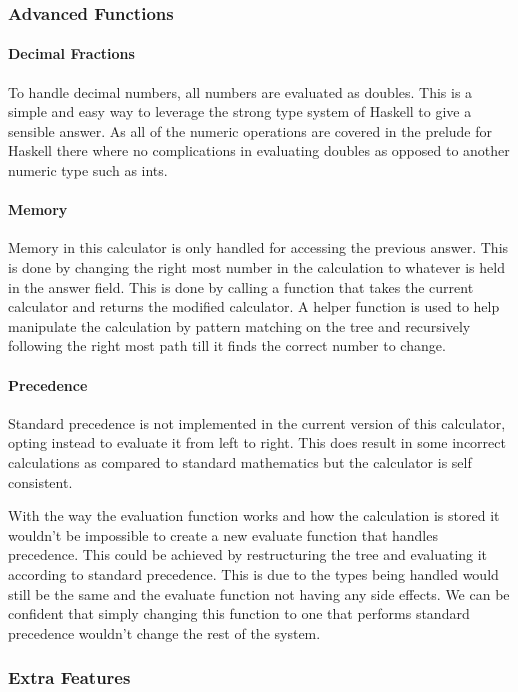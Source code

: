 \documentclass[a4paper]{article}
\begin{document}
\subsubsection{Advanced Functions}
\paragraph{Decimal Fractions}
To handle decimal numbers, all numbers are evaluated as doubles.
This is a simple and easy way to leverage the strong type system of Haskell to give a sensible answer.
As all of the numeric operations are covered in the prelude for Haskell there where no complications in evaluating doubles as opposed to another numeric type such as ints.

\paragraph{Memory}
Memory in this calculator is only handled for accessing the previous answer.
This is done by changing the right most number in the calculation to whatever is held in the answer field.
This is done by calling a function that takes the current calculator and returns the modified calculator.
A helper function is used to help manipulate the calculation by pattern matching on the tree and recursively following the right most path till it finds the correct number to change.


\paragraph{Precedence}
Standard precedence is not implemented in the current version of this calculator, opting instead to evaluate it from left to right.
This does result in some incorrect calculations as compared to standard mathematics but the calculator is self consistent.
\par
With the way the evaluation function works and how the calculation is stored it wouldn't be impossible to create a new evaluate function that handles precedence.
This could be achieved by restructuring the tree and evaluating it according to standard precedence.
This is due to the types being handled would still be the same and the evaluate function not having any side effects.
We can be confident that simply changing this function to one that performs standard precedence wouldn't change the rest of the system.

\subsubsection{Extra Features}
\end{document}
